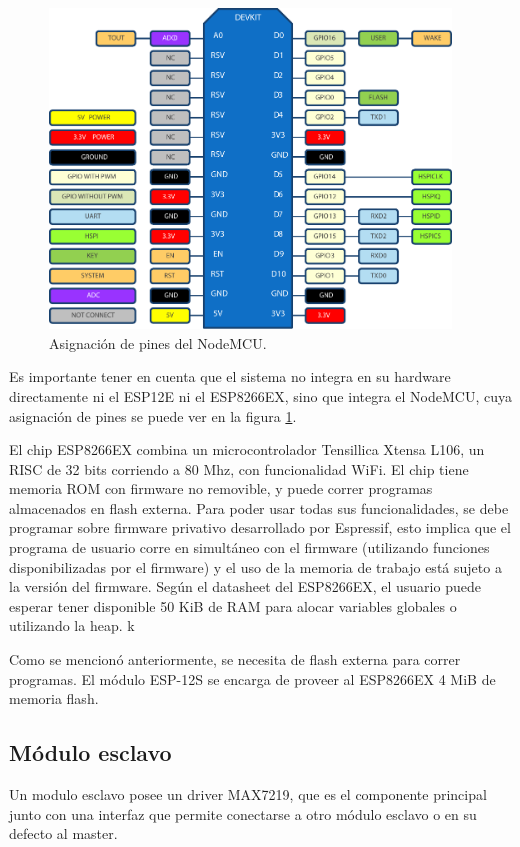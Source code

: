 \begin{figure}[ht!]
	\begin{center}
		\includegraphics[width=0.95\textwidth]{imagenes/nodemcu-pinout.pdf}
		\caption{Asignación de pines del NodeMCU.}
		\label{fig:nodemcu-pinout}
	\end{center}
\end{figure}

Es importante tener en cuenta que el sistema no integra en su hardware directamente ni el ESP12E ni el ESP8266EX, sino que integra el NodeMCU, cuya asignación de pines se puede ver en la figura \ref{fig:nodemcu-pinout}.

El chip ESP8266EX combina un microcontrolador Tensillica Xtensa L106, un RISC de 32 bits corriendo a 80 Mhz, con funcionalidad WiFi. \cite{ESP8266Datasheet} El chip tiene memoria ROM con firmware no removible, y puede correr programas almacenados en flash externa. Para poder usar todas sus funcionalidades, se debe programar sobre firmware privativo desarrollado por Espressif, esto implica que el programa de usuario corre en simultáneo con el firmware (utilizando funciones disponibilizadas por el firmware) y el uso de la memoria de trabajo está sujeto a la versión del firmware. Según el datasheet del ESP8266EX, el usuario puede esperar tener disponible 50 KiB de RAM para alocar variables globales o utilizando la heap.
k

Como se mencionó anteriormente, se necesita de flash externa para correr programas. El módulo ESP-12S se encarga de proveer al ESP8266EX 4 MiB de memoria flash.

\subsection{Módulo esclavo}
Un modulo esclavo posee un driver MAX7219, que es el componente principal junto con una interfaz que permite conectarse a otro módulo esclavo o en su defecto al master.

